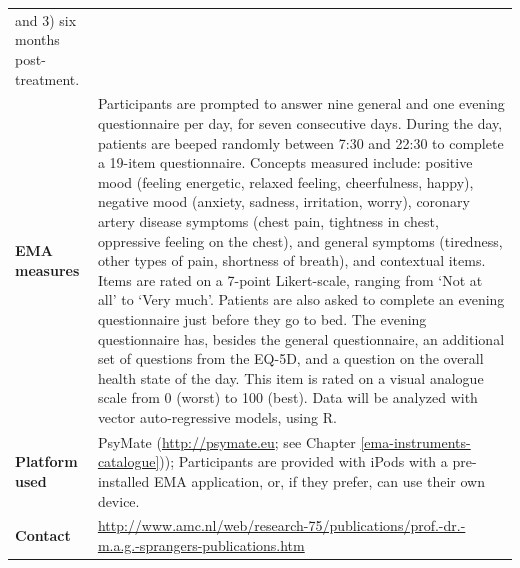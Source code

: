 \documentclass[]{book}
\begin{document}
\begin{longtable}[]{@{}ll@{}}
\begin{minipage}[t]{0.69\columnwidth}
and 3) six months post-treatment.\strut
\end{minipage}\tabularnewline
\begin{minipage}[t]{0.25\columnwidth}\raggedright\strut
\textbf{EMA measures}\strut
\end{minipage} & \begin{minipage}[t]{0.69\columnwidth}\raggedright\strut
Participants are prompted to answer nine general and one evening
questionnaire per day, for seven consecutive days. During the day,
patients are beeped randomly between 7:30 and 22:30 to complete a
19-item questionnaire. Concepts measured include: positive mood (feeling
energetic, relaxed feeling, cheerfulness, happy), negative mood
(anxiety, sadness, irritation, worry), coronary artery disease symptoms
(chest pain, tightness in chest, oppressive feeling on the chest), and
general symptoms (tiredness, other types of pain, shortness of breath),
and contextual items. Items are rated on a 7-point Likert-scale, ranging
from `Not at all' to `Very much'. Patients are also asked to complete an
evening questionnaire just before they go to bed. The evening
questionnaire has, besides the general questionnaire, an additional set
of questions from the EQ-5D, and a question on the overall health state
of the day. This item is rated on a visual analogue scale from 0 (worst)
to 100 (best). Data will be analyzed with vector auto-regressive models,
using R.\strut
\end{minipage}\tabularnewline
\begin{minipage}[t]{0.25\columnwidth}\raggedright\strut
\textbf{Platform used}\strut
\end{minipage} & \begin{minipage}[t]{0.69\columnwidth}\raggedright\strut
PsyMate (\url{http://psymate.eu}; see Chapter
\ref{ema-instruments-catalogue})); Participants are provided with iPods
with a pre-installed EMA application, or, if they prefer, can use their
own device.\strut
\end{minipage}\tabularnewline
\begin{minipage}[t]{0.25\columnwidth}\raggedright\strut
\textbf{Contact}\strut
\end{minipage} & \begin{minipage}[t]{0.69\columnwidth}\raggedright\strut
\url{http://www.amc.nl/web/research-75/publications/prof.-dr.-m.a.g.-sprangers-publications.htm}\strut
\end{minipage}\tabularnewline
\bottomrule
\end{longtable}
\end{document}
